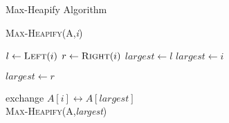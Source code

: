 \begin{frame}{Max-Heapify Algorithm}

\textsc{Max-Heapify}(A,\textit{i})

\begin{algorithmic}

\STATE $l\gets \textsc{Left}(i)$
\STATE $r\gets \textsc{Right}(i)$
\STATE $largest \gets l$
\ELSE
    $largest \gets i$
\ENDIF

\STATE $largest \gets r$
\ENDIF

\STATE exchange $A[i]\leftrightarrow A[largest]$
\ENDIF \\
\textsc{Max-Heapify}(A,\textit{largest})
\end{algorithmic}
\end{frame}
